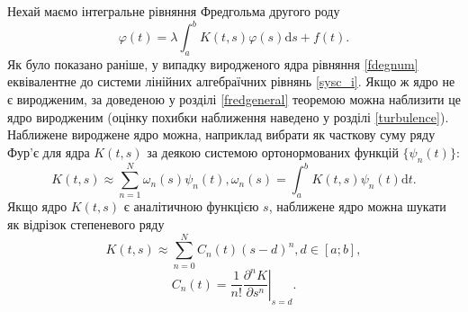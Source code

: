 \documentclass[14pt,twoside]{extreport}
\theoremstyle{mystyle}
\numberwithin{equation}{chapter}
\begin{document}
Нехай маємо інтегральне рівняння Фредгольма другого роду
\begin{equation}\label{fdegnum}
\displaystyle \varphi(t)=\lambda\int_{a}^{b}K(t, s)\varphi(s)\mathrm{d}s+f(t).
\end{equation}
Як було показано раніше, у випадку виродженого ядра рівняння \eqref{fdegnum} еквівалентне до системи лінійних алгебраїчних рівнянь \eqref{sysc_i}. Якщо ж ядро не є виродженим, за доведеною у розділі \ref{fredgeneral} теоремою можна наблизити це ядро виродженим (оцінку похибки наближення наведено у розділі \ref{turbulence}). Наближене вироджене ядро можна, наприклад вибрати як часткову суму ряду Фур'є для ядра $K(t, s)$ за деякою системою ортонормованих функцій $\{\psi_n(t)\}$:
\[
K(t,s) \approx \sum\limits_{n=1}^{N} \omega_n(s) \psi_n(t), \omega_n(s) = \int_{a}^{b} K(t, s) \psi_n(t)\mathrm{d}t.
\]
Якщо ядро $K(t,s)$ є аналітичною функцією $s$, наближене ядро можна шукати як відрізок степеневого ряду
\[
K(t, s) \approx \sum\limits_{n=0}^{N}C_n(t) (s-d)^n, d\in[a; b],
\]
\[
C_n(t) = \dfrac{1}{n!} \left.\dfrac{\partial^n K}{\partial s^n}\right|_{s=d}.
\]
\end{document}
